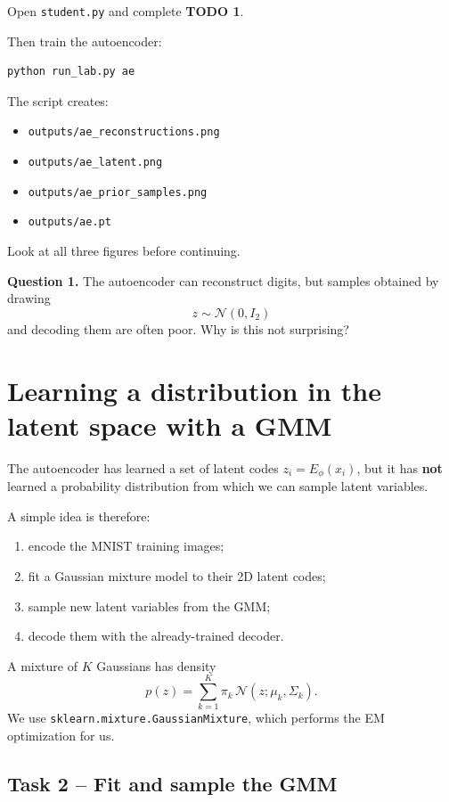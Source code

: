 \documentclass[11pt,a4paper]{article}
\newcommand{\question}[2]{%
  \vspace{0.4em}
  \noindent\textbf{Question #1.} #2
  \vspace{0.5em}
}
\begin{document}
Open \texttt{student.py} and complete \textbf{TODO 1}.

Then train the autoencoder:

\begin{lstlisting}[language=bash]
python run_lab.py ae
\end{lstlisting}

The script creates:
\begin{itemize}
  \item \texttt{outputs/ae\_reconstructions.png}
  \item \texttt{outputs/ae\_latent.png}
  \item \texttt{outputs/ae\_prior\_samples.png}
  \item \texttt{outputs/ae.pt}
\end{itemize}

Look at all three figures before continuing.

\question{1}{The autoencoder can reconstruct digits, but samples obtained by drawing
\[
z\sim\mathcal N(0,I_2)
\]
and decoding them are often poor. Why is this not surprising?}

\section{Learning a distribution in the latent space with a GMM}

The autoencoder has learned a set of latent codes $z_i=E_\phi(x_i)$, but it has \textbf{not} learned a probability distribution from which we can sample latent variables.

A simple idea is therefore:
\begin{enumerate}
  \item encode the MNIST training images;
  \item fit a Gaussian mixture model to their 2D latent codes;
  \item sample new latent variables from the GMM;
  \item decode them with the already-trained decoder.
\end{enumerate}

A mixture of $K$ Gaussians has density
\[
p(z)=\sum_{k=1}^K \pi_k\,\mathcal N(z;\mu_k,\Sigma_k).
\]
We use \texttt{sklearn.mixture.GaussianMixture}, which performs the EM optimization for us.

\subsection*{Task 2 -- Fit and sample the GMM}
\end{document}
